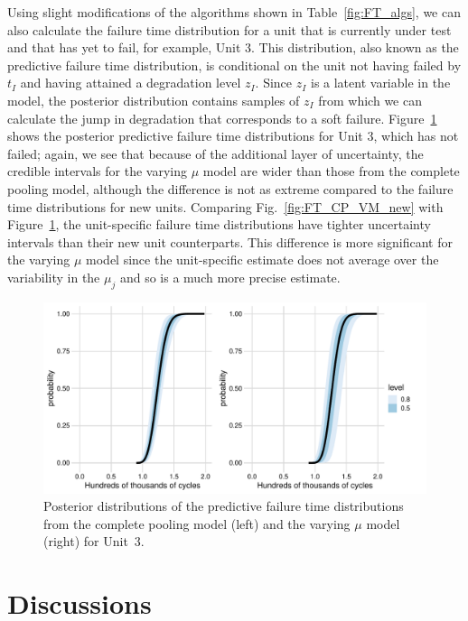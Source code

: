 Using slight modifications of the algorithms shown in Table~\ref{fig:FT_algs}, we can also calculate the failure time distribution for a unit that is currently under test and that has yet to fail, for example, Unit 3. This distribution, also known as the predictive failure time distribution\citep{lawless2004}, is conditional on the unit not having failed by $t_I$ and having attained a degradation level $z_I$. Since $z_I$ is a latent variable in the model, the posterior distribution contains samples of $z_I$ from which we can calculate the jump in degradation that corresponds to a soft failure. Figure~\ref{fig:FT_CP_VM_U3} shows the posterior predictive failure time distributions for Unit 3, which has not failed; again, we see that because of the additional layer of uncertainty, the credible intervals for the varying $\mu$ model are wider than those from the complete pooling model, although the difference is not as extreme compared to the failure time distributions for new units. Comparing Fig.~\ref{fig:FT_CP_VM_new} with Figure~\ref{fig:FT_CP_VM_U3}, the unit-specific failure time distributions have tighter uncertainty intervals than their new unit counterparts. This difference is more significant for the varying $\mu$ model since the unit-specific estimate does not average over the variability in the $\mu_j$ and so is a much more precise estimate.

\begin{figure}[h]
    \centering
    \includegraphics[width=0.95\columnwidth]{./figures/ch-5/FT_dist_Unit3.pdf}
    \caption{Posterior distributions of the predictive failure time distributions from the complete pooling model (left) and the varying $\mu$ model (right) for Unit~3.}
    \label{fig:FT_CP_VM_U3}
\end{figure}

\section{Discussions} \label{sec:unit-to-unit-discussion}

